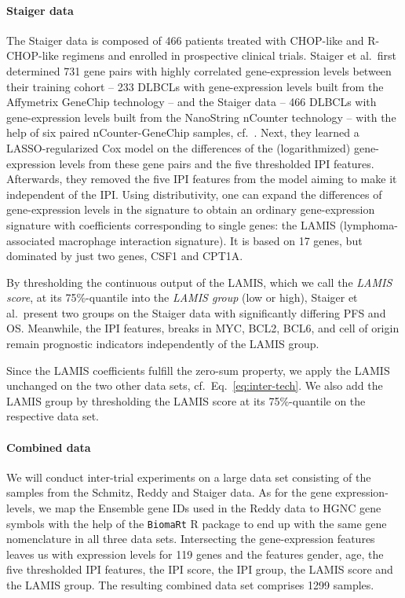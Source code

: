 \paragraph{Staiger data}

The Staiger data is composed of \num{466} patients treated with CHOP-like and R-CHOP-like regimens 
and enrolled in prospective clinical trials. 
Staiger et al.\ first determined \num{731} gene pairs with highly correlated gene-expression levels 
between their training cohort -- \num{233} DLBCLs with gene-expression levels built from the Affymetrix 
GeneChip technology -- and the Staiger data -- \num{466} DLBCLs with gene-expression levels built 
from the NanoString nCounter technology -- with the help of six paired nCounter-GeneChip samples, cf.\ 
\cite[Supplementary Methods]{staiger20}.
Next, they learned a LASSO-regularized Cox model on the differences of the (logarithmized) 
gene-expression levels from these gene pairs and the five thresholded IPI features.
Afterwards, they removed the five IPI features from the model aiming to make it independent of the 
IPI. Using distributivity, one can expand the differences of gene-expression levels in the 
signature to obtain an ordinary 
gene-expression signature with coefficients corresponding to single genes: the LAMIS 
(lymphoma-associated macrophage interaction signature). It is 
based on \num{17} genes, but dominated by just two genes, CSF1 and CPT1A. 

By thresholding the 
continuous output of the LAMIS, which we call the \textit{LAMIS score}, at its 75\%-quantile into 
the \textit{LAMIS group} (low or high), Staiger et al.\ present two 
groups on the Staiger data with significantly differing PFS and OS. 
Meanwhile, the IPI features, breaks in MYC, BCL2, BCL6, and cell of origin remain prognostic 
indicators independently of the LAMIS group.

Since the LAMIS coefficients fulfill the 
zero-sum property, we apply the LAMIS unchanged on the two other data sets, cf.\ Eq.\ 
\eqref{eq:inter-tech}. We also add the LAMIS group by thresholding the LAMIS score at its 
75\%-quantile on the respective data set.

\paragraph{Combined data}

We will conduct inter-trial experiments on a large data set consisting of the samples from the 
Schmitz, Reddy and Staiger data. As for the gene expression-levels, we map the Ensemble gene IDs 
used in the Reddy data to HGNC gene symbols with the help of the \texttt{BiomaRt} R package 
\cite{biomart09}
to end up with the same gene nomenclature in all three data sets. Intersecting the gene-expression 
features leaves us with expression levels for \num{119} genes and the features gender, age, 
the five thresholded IPI features, the IPI score, the IPI group, the LAMIS score and the LAMIS 
group. The resulting combined data set comprises \num{1299} samples.

